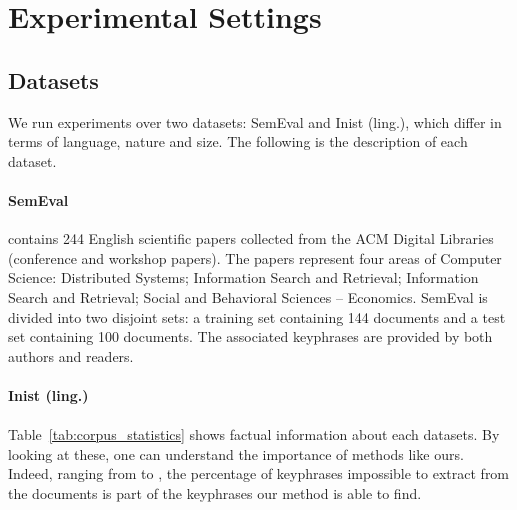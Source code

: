 \section{Experimental Settings}
\label{sec:experimental_settings}
  \subsection{Datasets}
  \label{subsec:datasets}
    We run experiments over two datasets: SemEval and Inist (ling.), which
    differ in terms of language, nature and size. The following is the
    description of each dataset.


    \paragraph{SemEval~\textnormal{\cite{kim2010semeval}}} contains 244 English
    scientific papers collected from the ACM Digital Libraries (conference and
    workshop papers). The papers represent four areas of Computer Science:
    Distributed Systems; Information Search and Retrieval; Information Search
    and Retrieval; Social and Behavioral Sciences – Economics. SemEval is
    divided into two disjoint sets: a training set containing 144 documents and
    a test set containing 100 documents. The associated keyphrases are provided
    by both authors and readers.

    \paragraph{Inist (ling.)} 

    \paragraph{}
    Table~\ref{tab:corpus_statistics} shows factual information about each
    datasets. By looking at these, one can understand the importance of methods
    like ours. Indeed, ranging from  to , the percentage
    of keyphrases impossible to extract from the documents is part of the
    keyphrases our method is able to find.

